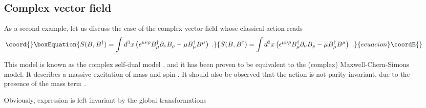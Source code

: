 \documentclass[a4paper,12pt]{article}
\begin{document}
\subsection{Complex vector field}
As a second example, let us discuss the case of the complex vector
field whose classical action reads
\begin{equation}\coord{}\boxEquation{
S(B,B^{\dagger })=\int d^3x\left( \epsilon ^{\mu \nu \rho }B_\mu^{\dagger }\partial _\nu B_\rho -\mu B_\mu ^{\dagger }B^\mu \right) \;.
\label{B-act}
}{
S(B,B^{\dagger })=\int d^3x\left( \epsilon ^{\mu \nu \rho }B_\mu^{\dagger }\partial _\nu B_\rho -\mu B_\mu ^{\dagger }B^\mu \right) \;.
}{ecuacion}\coordE{}\end{equation}

This model is known as the complex self-dual model \cite{self-dual},
and it has been proven to be equivalent to the (complex)
Maxwell-Chern-Simons model. It describes a massive excitation of mass
\myHighlight{$\mu$}\coordHE{} and spin \coordHE{}. It should also be observed that the
action \myHighlight{$\left( {\rm {\ref {B-act}}}\right) $}\coordHE{} is not parity invariant,
due to the presence of the mass term \coordHE{}.

\noindent Obviously, expression \myHighlight{$\left( {\rm {\ref{B-act}}}\right) $}\coordHE{} is left
invariant by the global \coordHE{} transformations
\end{document}
